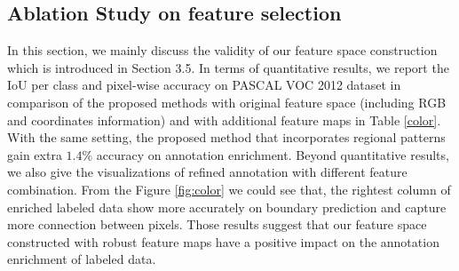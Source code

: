 \documentclass[sigconf]{acmart}
\begin{document}
\subsection{Ablation Study on feature selection}
In this section, we mainly discuss the validity of our feature space construction which is introduced in Section 3.5. In terms of quantitative results,  we report the IoU per class and pixel-wise accuracy on PASCAL VOC 2012 dataset in comparison of the proposed methods with original feature space (including RGB and coordinates information) and with additional feature maps in Table \ref{color}. With the same setting, the proposed method that incorporates regional patterns gain extra $1.4\%$ accuracy on annotation enrichment. Beyond quantitative results, we also give the visualizations of refined annotation with different feature combination. From the Figure \ref{fig:color} we could see that, the rightest column of enriched labeled data show more accurately on boundary prediction and capture more connection between pixels. Those results suggest that our feature space constructed with robust feature maps have a positive impact on the annotation enrichment of labeled data. 
\begin{table*}
	\caption{Comparisons of annotation enrichment algorithm with pure local (e.g., RGB, coordinates) features and with additional feature maps (\textit{the last line}) on the PASCAL VOC 2012 dataset \textit{w.r.t} IoU and Accuracy.}
	\label{color}
\end{table*}
\end{document}
